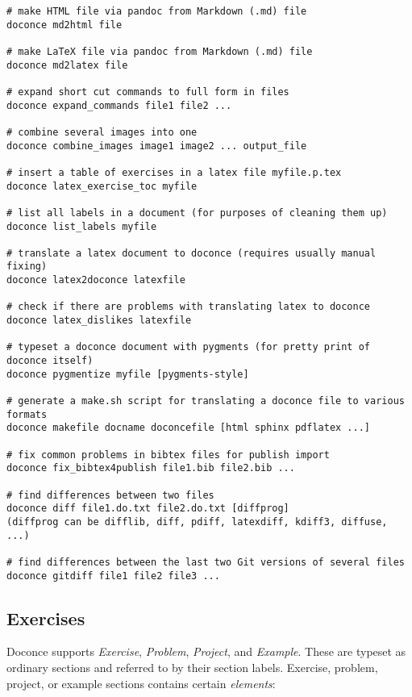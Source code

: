 \documentclass[%
oneside,                 %
final,                   %
10pt]{article}
\begin{document}
\begin{Verbatim}[numbers=none,fontsize=\fontsize{9pt}{9pt},baselinestretch=0.85,xleftmargin=0mm]
# make HTML file via pandoc from Markdown (.md) file
doconce md2html file

# make LaTeX file via pandoc from Markdown (.md) file
doconce md2latex file

# expand short cut commands to full form in files
doconce expand_commands file1 file2 ...

# combine several images into one
doconce combine_images image1 image2 ... output_file

# insert a table of exercises in a latex file myfile.p.tex
doconce latex_exercise_toc myfile

# list all labels in a document (for purposes of cleaning them up)
doconce list_labels myfile

# translate a latex document to doconce (requires usually manual fixing)
doconce latex2doconce latexfile

# check if there are problems with translating latex to doconce
doconce latex_dislikes latexfile

# typeset a doconce document with pygments (for pretty print of doconce itself)
doconce pygmentize myfile [pygments-style]

# generate a make.sh script for translating a doconce file to various formats
doconce makefile docname doconcefile [html sphinx pdflatex ...]

# fix common problems in bibtex files for publish import
doconce fix_bibtex4publish file1.bib file2.bib ...

# find differences between two files
doconce diff file1.do.txt file2.do.txt [diffprog]
(diffprog can be difflib, diff, pdiff, latexdiff, kdiff3, diffuse, ...)

# find differences between the last two Git versions of several files
doconce gitdiff file1 file2 file3 ...
\end{Verbatim}

\subsection{Exercises}

Doconce supports \emph{Exercise}, \emph{Problem}, \emph{Project}, and \emph{Example}.
These are typeset
as ordinary sections and referred to by their section labels.
Exercise, problem, project, or example sections contains certain \emph{elements}:
\end{document}
